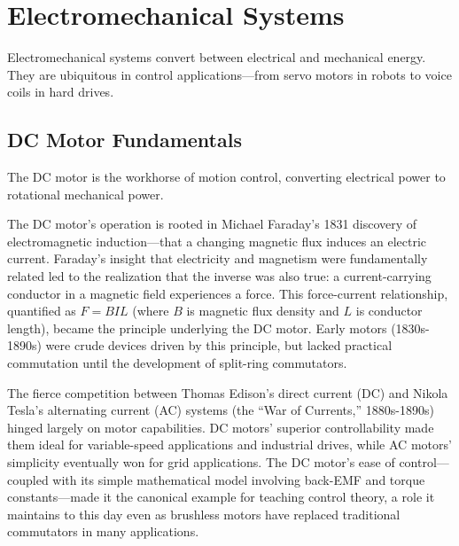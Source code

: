 
\chapter{Electromechanical Systems}
\label{ch:electromechanical}

Electromechanical systems convert between electrical and mechanical energy. They are ubiquitous in control applications---from servo motors in robots to voice coils in hard drives.

\section{DC Motor Fundamentals}
\label{sec:dc_motor}

The DC motor is the workhorse of motion control, converting electrical power to rotational mechanical power.
\begin{historicalbox}[title=Historical Context: Faraday's Electromagnetic Induction and the Motor-Generator Principle]
The DC motor's operation is rooted in Michael Faraday's 1831 discovery of electromagnetic induction---that a changing magnetic flux induces an electric current. Faraday's insight that electricity and magnetism were fundamentally related led to the realization that the inverse was also true: a current-carrying conductor in a magnetic field experiences a force. This force-current relationship, quantified as $F = BIL$ (where $B$ is magnetic flux density and $L$ is conductor length), became the principle underlying the DC motor. Early motors (1830s-1890s) were crude devices driven by this principle, but lacked practical commutation until the development of split-ring commutators.

The fierce competition between Thomas Edison's direct current (DC) and Nikola Tesla's alternating current (AC) systems (the ``War of Currents,'' 1880s-1890s) hinged largely on motor capabilities. DC motors' superior controllability made them ideal for variable-speed applications and industrial drives, while AC motors' simplicity eventually won for grid applications. The DC motor's ease of control---coupled with its simple mathematical model involving back-EMF and torque constants---made it the canonical example for teaching control theory, a role it maintains to this day even as brushless motors have replaced traditional commutators in many applications.
\end{historicalbox}

